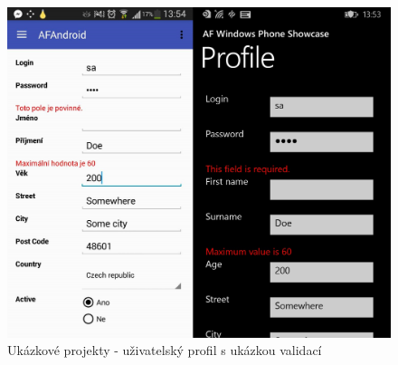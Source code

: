 \begin{figure}
\begin{center}
\includegraphics[width=\linewidth, height=\textheight, keepaspectratio]{figures/screenshots/ProfileValidations}
\caption{Ukázkové projekty - uživatelský profil s ukázkou validací}
\label{img:profileValidations}
\end{center}
\end{figure}	

